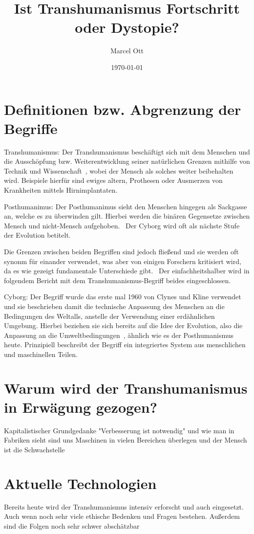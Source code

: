 \documentclass[a4paper,
DIV=13,
12pt,
BCOR=10mm,
department=FakEI,
twoside,
parskip=half,
automark,
]{OTHRartcl}
\date{\today}
\title{Ist Transhumanismus Fortschritt oder Dystopie?}
\author{Marcel Ott}
\begin{document}
\maketitle

\section*{Definitionen bzw. Abgrenzung der Begriffe}

Transhumanismus: Der Transhumanismus beschäftigt sich mit dem Menschen und die Ausschöpfung bzw. Weiterentwicklung seiner natürlichen Grenzen mithilfe von Technik und Wissenschaft~\cite{Merzlyakov2022},
wobei der Mensch als solches weiter beibehalten wird. Beispiele hierfür sind ewiges altern, Prothesen oder Ausmerzen von Krankheiten mittels Hirnimplantaten.

Posthumanimus: Der Posthumanimus sieht den Menschen hingegen als Sackgasse an, welche es zu überwinden gilt. Hierbei werden die binären Gegensetze zwischen Mensch und nicht-Mensch aufgehoben.~\cite{Merzlyakov2022}
Der Cyborg wird oft als nächste Stufe der Evolution betitelt.

Die Grenzen zwischen beiden Begriffen sind jedoch fließend und sie werden oft synonm für einander verwendet, was aber von einigen Forschern kritisiert wird, da es wie gezeigt fundamentale Unterschiede gibt.~\cite{Merzlyakov2022}
Der ein­fach­heits­hal­ber wird in folgendem Bericht mit dem Transhumanismus-Begriff beides eingeschlossen.

Cyborg: Der Begriff wurde das erste mal 1960 von Clynes und Kline verwendet und sie beschrieben damit die technische Anpassung des Menschen an die Bedingungen des Weltalls, anstelle der Verwendung 
einer erdähnlichen Umgebung. Hierbei beziehen sie sich bereits auf die Idee der Evolution, also die Anpassung an die Umweltbedingungen~\cite{clynes1960cyborgs}, ähnlich wie es der Posthumanismus heute.
Prinzipiell beschreibt der Begriff ein integriertes System aus menschlichen und maschinellen Teilen.~\cite{warwick2000cyborg}

\section*{Warum wird der Transhumanismus in Erwägung gezogen?}
Kapitalistischer Grundgedanke "Verbesserung ist notwendig" und wie man in Fabriken sieht sind uns Maschinen in vielen Bereichen überlegen und der Mensch ist die Schwachstelle

\section*{Aktuelle Technologien}
Bereits heute wird der Transhumanismus intensiv erforscht und auch eingesetzt. Auch wenn noch sehr viele ethische Bedenken und Fragen bestehen. Außerdem sind die Folgen noch sehr schwer abschätzbar
\end{document}
